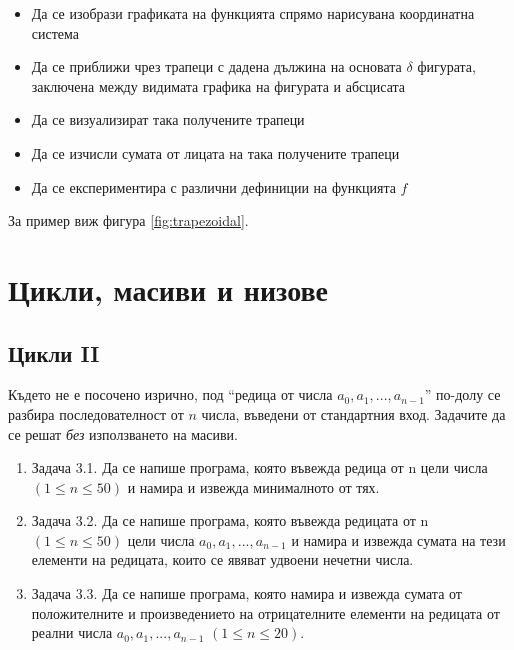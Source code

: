 {\begin{enumerate}[resume]
	\begin{itemize}
		\item Да се изобрази графиката на функцията спрямо нарисувана координатна система
		\item Да се приближи чрез трапеци с дадена дължина на основата $\delta$ фигурата, заключена между видимата графика на фигурата и абсцисата
		\item Да се визуализират така получените трапеци
		\item Да се изчисли сумата от лицата на така получените трапеци
		\item Да се експериментира с различни дефиниции на функцията $f$
	\end{itemize}

  За пример виж фигура \ref{fig:trapezoidal}.

\end{enumerate}


\clearpage\section {Цикли, масиви и низове}

\subsection {Цикли \textrm{II}}

Където не е посочено изрично, под ``редица от числа $a_0, a_1, ..., a_{n-1}$'' по-долу се разбира последователност от $n$ числа, въведени от стандартния вход. Задачите да се решат \emph{без} използването на масиви.


\begin{enumerate}[]


		\item Задача 3.1. \cite{sbornik} Да се напише програма, която въвежда редица от n цели числа $(1 \leq n \leq 50)$ и намира и извежда минималното от тях.

		\item Задача 3.2. \cite{sbornik} Да се напише програма, която въвежда редицата от n $(1 \leq n \leq 50)$ цели числа $a_0, a_1, ..., a_{n-1}$ и намира и извежда сумата на тези елементи на редицата, които се явяват удвоени нечетни числа.

		\item Задача 3.3. \cite{sbornik} Да се напише програма, която намира и извежда сумата от положителните и произведението на отрицателните елементи на редицата от реални числа $a_0, a_1, ..., a_{n-1}$ $(1 \leq n \leq 20)$.


\end{enumerate}}
